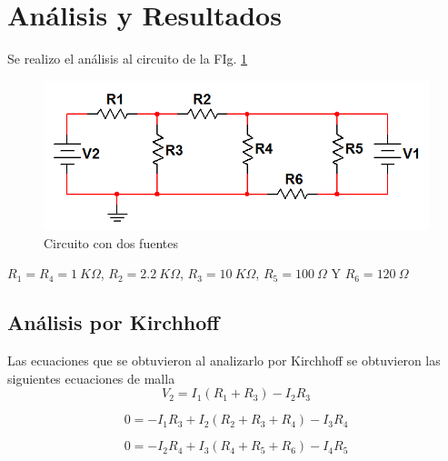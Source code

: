 \documentclass[twocolumn]{IEEEtran}
\begin{document}
\section{Análisis y Resultados}
\noindent
Se realizo el análisis al circuito de la FIg. \ref{fig1}
\begin{figure}[H]
	\centering
		\includegraphics[scale=0.5]{m1.png}
	\caption{Circuito con dos fuentes}
	\label{fig1}
\end{figure}
\noindent
$R_1=R_4=1\ K \Omega$, $R_2=2.2 \ K \Omega$, $R_3=10 \ K \Omega$, $R_5= 100 \ \Omega$ Y $R_6 = 120 \ \Omega$

\subsection{Análisis por Kirchhoff}
\noindent
Las ecuaciones que se obtuvieron al analizarlo por Kirchhoff se obtuvieron las siguientes ecuaciones de malla
\begin{equation}
 {V_2} = {I_1}\left( {{R_1} + {R_3}} \right) - {I_2}{R_3}
\label{ecu1}
\end{equation}

\begin{equation}
 0 =  - {I_1}{R_3} + {I_2}\left( {{R_2} + {R_3} + {R_4}} \right) - {I_3}{R_4}
\label{ecu2}
\end{equation}

\begin{equation}
 0 =  - {I_2}{R_4} + {I_3}\left( {{R_4} + {R_5} + {R_6}} \right) - {I_4}{R_5}
\label{ecu3}
\end{equation}
\end{document}
